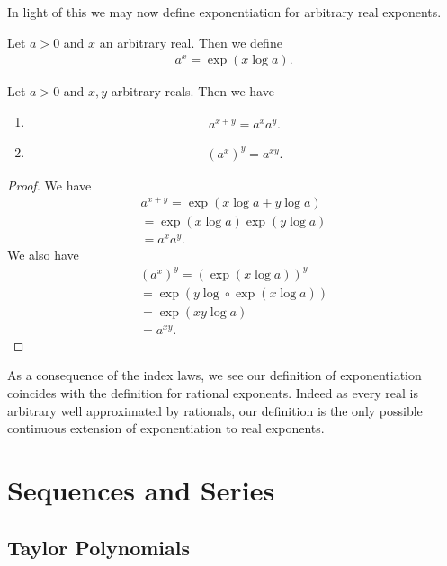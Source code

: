 \documentclass[]{article}
\begin{document}
In light of this we may now define exponentiation for arbitrary real exponents.

\begin{defi} [Exponentiation]
	Let $a > 0$ and $x$ an arbitrary real. Then we define
	\begin{align*}
			a^x = \exp(x\log a).
	\end{align*}
\end{defi}

\begin{thm} 
	Let $a > 0$ and $x,y$ arbitrary reals. Then we have
	\begin{enumerate}
			\item \begin{align*}
							a^{x+y} = a^x a^y.
			\end{align*}
	\item \begin{align*}
					(a^x)^y = a^{xy}.
	\end{align*}
	\end{enumerate}
\end{thm}

\begin{proof}
		We have
		\begin{align*}
				a^{x+y} = \exp(x \log a + y \log a) \\
				= \exp(x \log a) \exp(y \log a) \\
				= a^xa^y.
		\end{align*}
		We also have
		\begin{align*}
				(a^x)^y = (\exp(x \log a))^y \\
				= \exp(y \log \circ \exp (x \log a)) \\
		= \exp (xy \log a) \\
		= a^{xy}.
		\end{align*}
\end{proof}

As a consequence of the index laws, we see our definition of exponentiation coincides with the definition for rational exponents. Indeed as every real is arbitrary well approximated by rationals, our definition is the only possible continuous extension of exponentiation to real exponents.

\section{Sequences and Series}

\subsection{Taylor Polynomials}
\end{document}
